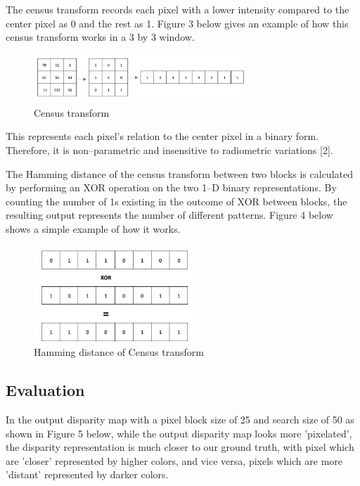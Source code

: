 \documentclass[conference]{IEEEtran}
\begin{document}
The census transform records each pixel with a lower intensity compared to the center pixel as 0 and the rest as 1. Figure 3 below gives an example of how this census transform works in a 3 by 3 window.

\begin{figure}[H]
    \centering
    \includegraphics[width=8cm]{fig1.png}
    \caption{Census transform}
\end{figure}

This represents each pixel's relation to the center pixel in a binary form. Therefore, it is non--parametric and insensitive to radiometric variations [2].

The Hamming distance of the census transform between two blocks is calculated by performing an XOR operation on the two 1--D binary representations. By counting the number of 1s existing in the outcome of XOR between blocks, the resulting output represents the number of different patterns. Figure 4 below shows a simple example of how it works.

\begin{figure}[H]
    \centering
    \includegraphics[width=6cm]{fig2.png}
    \caption{Hamming distance of Census transform}
\end{figure}

\subsection{Evaluation}

In the output disparity map with a pixel block size of 25 and search size of 50 as shown in Figure 5 below, while the output disparity map looks more 'pixelated', the disparity representation is much closer to our ground truth, with pixel which are 'closer' represented by higher colors, and vice versa, pixels which are more 'distant' represented by darker colors.
\end{document}
